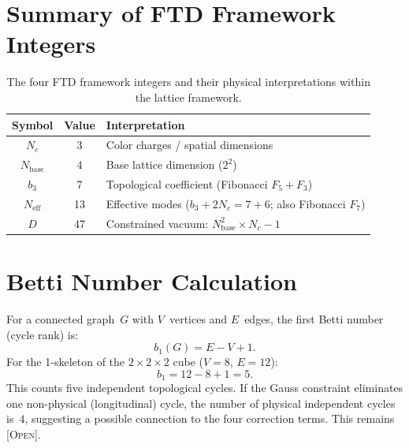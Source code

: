 \documentclass[11pt,twoside]{article}
\theoremstyle{remark}
\newcommand{\etag}[1]{\textsc{\small[#1]}}
\newcommand{\openq}{\etag{Open}}
\begin{document}
\section{Summary of FTD Framework Integers}
\label{app:integers}

\begin{table}[H]
    \centering
    \caption{The four FTD framework integers and their physical interpretations within the lattice framework.}
    \label{tab:integers}
    \begin{tabular}{@{}ccl@{}}
        \toprule
        \textbf{Symbol} & \textbf{Value} & \textbf{Interpretation} \\
        \midrule
        $N_c$ & 3 & Color charges / spatial dimensions \\
        $N_{\mathrm{base}}$ & 4 & Base lattice dimension ($2^2$) \\
        $b_3$ & 7 & Topological coefficient (Fibonacci $F_5 + F_3$) \\
        $N_{\mathrm{eff}}$ & 13 & Effective modes ($b_3 + 2 N_c = 7 + 6$; also Fibonacci $F_7$) \\
        \midrule
        $D$ & 47 & Constrained vacuum: $N_{\mathrm{base}}^2 \times N_c - 1$ \\
        \bottomrule
    \end{tabular}
\end{table}


\section{Betti Number Calculation}
\label{app:betti}

For a connected graph~$G$ with $V$~vertices and $E$~edges, the first Betti number (cycle rank) is:
\begin{equation}
    b_1(G) = E - V + 1.
\end{equation}
For the 1-skeleton of the $2 \times 2 \times 2$ cube ($V = 8$, $E = 12$):
\begin{equation}
    b_1 = 12 - 8 + 1 = 5.
\end{equation}
This counts five independent topological cycles.
If the Gauss constraint eliminates one non-physical (longitudinal) cycle, the number of physical independent cycles is~$4$, suggesting a possible connection to the four correction terms.
This remains \openq.
\end{document}
